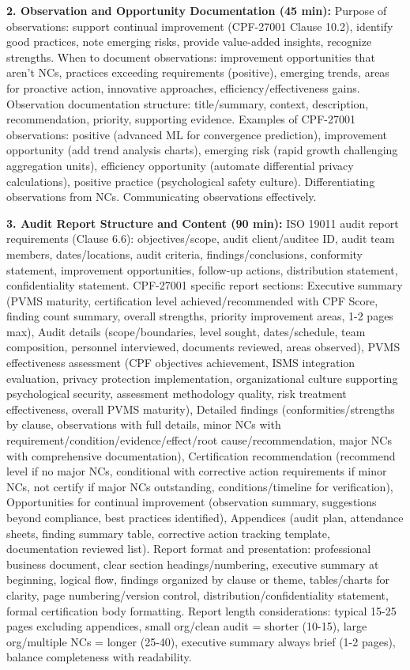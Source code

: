 \documentclass[11pt,a4paper]{article}
\begin{document}
\textbf{2. Observation and Opportunity Documentation (45 min):} Purpose of observations: support continual improvement (CPF-27001 Clause 10.2), identify good practices, note emerging risks, provide value-added insights, recognize strengths. When to document observations: improvement opportunities that aren't NCs, practices exceeding requirements (positive), emerging trends, areas for proactive action, innovative approaches, efficiency/effectiveness gains. Observation documentation structure: title/summary, context, description, recommendation, priority, supporting evidence. Examples of CPF-27001 observations: positive (advanced ML for convergence prediction), improvement opportunity (add trend analysis charts), emerging risk (rapid growth challenging aggregation units), efficiency opportunity (automate differential privacy calculations), positive practice (psychological safety culture). Differentiating observations from NCs. Communicating observations effectively.

\textbf{3. Audit Report Structure and Content (90 min):} ISO 19011 audit report requirements (Clause 6.6): objectives/scope, audit client/auditee ID, audit team members, dates/locations, audit criteria, findings/conclusions, conformity statement, improvement opportunities, follow-up actions, distribution statement, confidentiality statement. CPF-27001 specific report sections: Executive summary (PVMS maturity, certification level achieved/recommended with CPF Score, finding count summary, overall strengths, priority improvement areas, 1-2 pages max), Audit details (scope/boundaries, level sought, dates/schedule, team composition, personnel interviewed, documents reviewed, areas observed), PVMS effectiveness assessment (CPF objectives achievement, ISMS integration evaluation, privacy protection implementation, organizational culture supporting psychological security, assessment methodology quality, risk treatment effectiveness, overall PVMS maturity), Detailed findings (conformities/strengths by clause, observations with full details, minor NCs with requirement/condition/evidence/effect/root cause/recommendation, major NCs with comprehensive documentation), Certification recommendation (recommend level if no major NCs, conditional with corrective action requirements if minor NCs, not certify if major NCs outstanding, conditions/timeline for verification), Opportunities for continual improvement (observation summary, suggestions beyond compliance, best practices identified), Appendices (audit plan, attendance sheets, finding summary table, corrective action tracking template, documentation reviewed list). Report format and presentation: professional business document, clear section headings/numbering, executive summary at beginning, logical flow, findings organized by clause or theme, tables/charts for clarity, page numbering/version control, distribution/confidentiality statement, formal certification body formatting. Report length considerations: typical 15-25 pages excluding appendices, small org/clean audit = shorter (10-15), large org/multiple NCs = longer (25-40), executive summary always brief (1-2 pages), balance completeness with readability.
\end{document}
